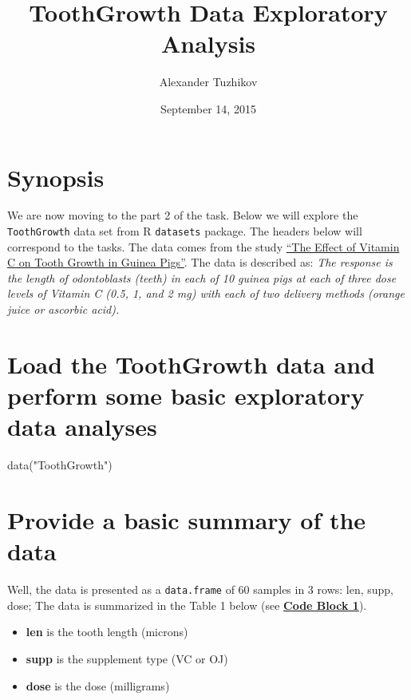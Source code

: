 \documentclass[]{article}
\title{ToothGrowth Data Exploratory Analysis}
\author{Alexander Tuzhikov}
\date{September 14, 2015}
\newenvironment{Shaded}{}{}
\newcommand{\KeywordTok}[1]{\textcolor[rgb]{0.00,0.00,1.00}{{#1}}}
\newcommand{\StringTok}[1]{\textcolor[rgb]{0.00,0.50,0.50}{{#1}}}
\newcommand{\NormalTok}[1]{{#1}}
\providecommand{\tightlist}{%
  \setlength{\itemsep}{0pt}\setlength{\parskip}{0pt}}
\begin{document}
\maketitle

\section{Synopsis}\label{synopsis}

We are now moving to the part 2 of the task. Below we will explore the
\texttt{ToothGrowth} data set from R \texttt{datasets} package. The
headers below will correspond to the tasks. The data comes from the
study \href{http://jn.nutrition.org/content/33/5/491.full.pdf}{``The
Effect of Vitamin C on Tooth Growth in Guinea Pigs''}. The data is
described as: \emph{The response is the length of odontoblasts (teeth)
in each of 10 guinea pigs at each of three dose levels of Vitamin C
(0.5, 1, and 2 mg) with each of two delivery methods (orange juice or
ascorbic acid).}

\section{Load the ToothGrowth data and perform some basic exploratory
data
analyses}\label{load-the-toothgrowth-data-and-perform-some-basic-exploratory-data-analyses}

\begin{Shaded}
\begin{Highlighting}[]
\KeywordTok{data}\NormalTok{(}\StringTok{"ToothGrowth"}\NormalTok{)}
\end{Highlighting}
\end{Shaded}

\section{Provide a basic summary of the
data}\label{provide-a-basic-summary-of-the-data}

Well, the data is presented as a \texttt{data.frame} of 60 samples in 3
rows: len, supp, dose; The data is summarized in the Table 1 below (see
\textbf{\hyperref[code-block-1]{Code Block 1}}).

\begin{itemize}
\tightlist
\item
  \textbf{len} is the tooth length (microns)
\item
  \textbf{supp} is the supplement type (VC or OJ)
\item
  \textbf{dose} is the dose (milligrams)
\end{itemize}
\end{document}

